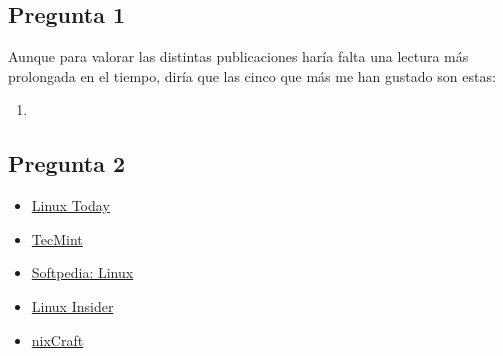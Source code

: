 \subsection{Pregunta 1}
Aunque para valorar las distintas publicaciones haría falta una lectura más prolongada en el tiempo, diría que las cinco que más me han gustado son estas:
\begin{enumerate}
    \item 
\end{enumerate}

\subsection{Pregunta 2}

\begin{itemize}
    \item \href{https://www.linuxtoday.com/}{Linux Today}
    \item \href{https://www.tecmint.com/}{TecMint}
    \item \href{https://linux.softpedia.com}{Softpedia: Linux}
    \item \href{https://linuxinsider.com/}{Linux Insider}
    \item \href{https://www.cyberciti.biz/}{nixCraft}
\end{itemize}


